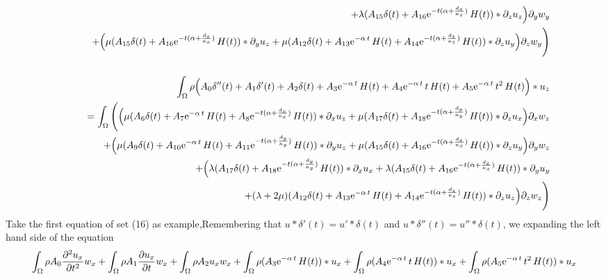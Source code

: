 \documentclass[onecolumn,extra]{gji_modified_cours_UPPA}
\begin{document}
\begin{eqnarray}
&&\,\,\,\,\,\,\,\,\,\,\,\,\,\,\,\,\,\,\,\,\,\,\,\,+ \lambda (A_{15}\delta(t) + A_{16} {\rm e}^{-t(\alpha+\frac{d_x}{\kappa_x})} \, H(t))\ast \partial_z u_z\Big) \partial_y w_y  \nonumber \\
&&\,\,\,\,\,\,\,\,\,\,\,\,\,\,\,+ \Big( \mu (A_{15}\delta(t) + A_{16} {\rm e}^{-t(\alpha+\frac{d_x}{\kappa_x})} \, H(t))\ast \partial_y u_z
+ \mu (A_{12}\delta(t) + A_{13} {\rm e}^{-\alpha\,t} \, H(t) + A_{14} {\rm e}^{-t(\alpha+\frac{d_z}{\kappa_z})} \, H(t))\ast \partial_z u_y\Big) \partial_z w_y  \Bigg) \nonumber \\ \nonumber \\
%
&&\int_\Omega \rho \Big(A_0 \delta''(t) + A_1 \delta'(t) + A_2 \delta(t)
+ A_3 {\rm e}^{-\alpha\,t} \, H(t)
+ A_4 {\rm e}^{-\alpha\,t} \,t\, H(t)
+ A_5 {\rm e}^{-\alpha\,t} \,t^{2} \,H(t)\Big) \ast u_z \nonumber  \\
&& =  \int_\Omega \Bigg( \Big( \mu (A_6\delta(t) + A_7 {\rm e}^{-\alpha\,t} \, H(t) + A_8 {\rm e}^{-t(\alpha+\frac{d_x}{\kappa_x})} \, H(t))\ast \partial_x u_z
+ \mu (A_{17}\delta(t) + A_{18} {\rm e}^{-t(\alpha+\frac{d_y}{\kappa_y})} \, H(t)) \ast \partial_z u_x \Big) \partial_x w_z \nonumber  \\
&&\,\,\,\,\,\,\,\,\,\,\,\,\,\,\, + \Big( \mu (A_9\delta(t) + A_{10} {\rm e}^{-\alpha\,t} \, H(t) + A_{11} {\rm e}^{-t(\alpha+\frac{d_y}{\kappa_y})} \, H(t)) \ast \partial_y u_z
+ \mu (A_{15}\delta(t) + A_{16} {\rm e}^{-t(\alpha+\frac{d_x}{\kappa_x})} \, H(t)) \ast \partial_z u_y \Big) \partial_y w_z   \nonumber \\
&&\,\,\,\,\,\,\,\,\,\,\,\,\,\,\,+\Big( \lambda (A_{17}\delta(t) + A_{18} {\rm e}^{-t(\alpha+\frac{d_y}{\kappa_y})} \, H(t))\ast \partial_x u_x
+ \lambda (A_{15}\delta(t) + A_{16} {\rm e}^{-t(\alpha+\frac{d_x}{\kappa_x})} \, H(t)) \ast \partial_y u_y\nonumber \\
&&\,\,\,\,\,\,\,\,\,\,\,\,\,\,\,\,\,\,\,\,\,\,\,\,+ (\lambda + 2 \mu)(A_{12}\delta(t) + A_{13} {\rm e}^{-\alpha\,t} \, H(t) + A_{14} {\rm e}^{-t(\alpha+\frac{d_z}{\kappa_z})} \, H(t))\ast\partial_z u_z\Big) \partial_z w_z \Bigg)
\end{eqnarray}
%
Take the first equation of set (16) as example,Remembering that $u * \delta'(t) = u' * \delta(t)$ and $u * \delta''(t) = u'' * \delta(t)$, we
expanding the left hand side of the equation
%
$$\int_\Omega \rho A_0 \frac{\partial^2 u_x}{\partial t^2}w_x+
\int_\Omega \rho A_1 \frac{\partial u_x}{\partial t} w_x +
\int_\Omega \rho A_2 u_x w_x +
\int_\Omega \rho (A_3 {\rm e}^{-\alpha\,t} \, H(t)) \ast u_x+
\int_\Omega \rho (A_4 {\rm e}^{-\alpha\,t} \,t\, H(t)) \ast u_x +
\int_\Omega \rho (A_5 {\rm e}^{-\alpha\,t} \,t^{2} \,H(t)) \ast u_x
$$
%
\end{document}
